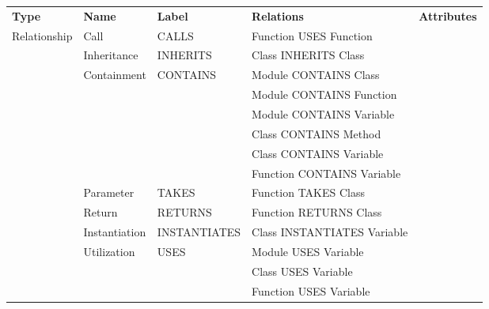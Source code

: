 \begin{tabular}{p{1.6cm}p{1.7cm}p{2cm}p{4.3cm}p{6.5cm}}
\toprule
\textbf{Type} & \textbf{Name} & \textbf{Label} & \textbf{Relations} & \textbf{Attributes} \\
\cmidrule{1-1}\cmidrule{2-2}\cmidrule{3-3}\cmidrule{4-4}\cmidrule{5-5}
\multirow{14}{*}{Relationship \bigstrut} & Call & CALLS & Function USES Function &  \\
\cmidrule{2-2}\cmidrule{3-3}\cmidrule{4-4}\cmidrule{5-5}
 & Inheritance & INHERITS & Class INHERITS Class &  \\
\cmidrule{2-2}\cmidrule{3-3}\cmidrule{4-4}\cmidrule{5-5}
 & \multirow{6}{*}{Containment \bigstrut} & \multirow{6}{*}{CONTAINS \bigstrut} & Module CONTAINS Class &  \\
\cmidrule{4-4}\cmidrule{5-5}
 &  &  & Module CONTAINS Function &  \\
\cmidrule{4-4}\cmidrule{5-5}
 &  &  & Module CONTAINS Variable &  \\
\cmidrule{4-4}\cmidrule{5-5}
 &  &  & Class CONTAINS Method &  \\
\cmidrule{4-4}\cmidrule{5-5}
 &  &  & Class CONTAINS Variable &  \\
\cmidrule{4-4}\cmidrule{5-5}
 &  &  & Function CONTAINS Variable &  \\
\cmidrule{2-2}\cmidrule{3-3}\cmidrule{4-4}\cmidrule{5-5}
 & Parameter & TAKES & Function TAKES Class &  \\
\cmidrule{2-2}\cmidrule{3-3}\cmidrule{4-4}\cmidrule{5-5}
 & Return & RETURNS & Function RETURNS Class &  \\
\cmidrule{2-2}\cmidrule{3-3}\cmidrule{4-4}\cmidrule{5-5}
 & Instantiation & INSTANTIATES & Class INSTANTIATES Variable &  \\
\cmidrule{2-2}\cmidrule{3-3}\cmidrule{4-4}\cmidrule{5-5}
 & \multirow{3}{*}{Utilization \bigstrut} & \multirow{3}{*}{USES \bigstrut} & Module USES Variable &  \\
\cmidrule{4-4}\cmidrule{5-5}
 &  &  & Class USES Variable &  \\
\cmidrule{4-4}\cmidrule{5-5}
 &  &  & Function USES Variable &  \\
\bottomrule
\end{tabular}

